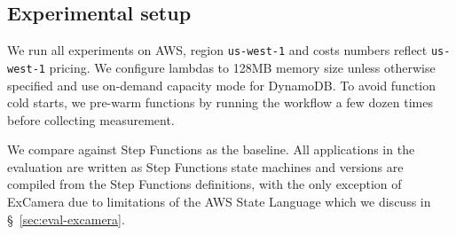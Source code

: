 




\subsection{Experimental setup}

We run all experiments on AWS, region \texttt{us-west-1} and costs numbers
reflect \texttt{us-west-1} pricing. We configure lambdas to 128MB memory size
unless otherwise specified and use on-demand capacity mode for DynamoDB. To
avoid function cold starts, we pre-warm functions by running the workflow a
few dozen times before collecting measurement.


We compare against Step Functions as the baseline. All applications in the
evaluation are written as Step Functions state machines and \name{} versions
are compiled from the Step Functions definitions, with the only exception of
ExCamera due to limitations of the AWS State Language which we discuss in
\S~\ref{sec:eval-excamera}.



